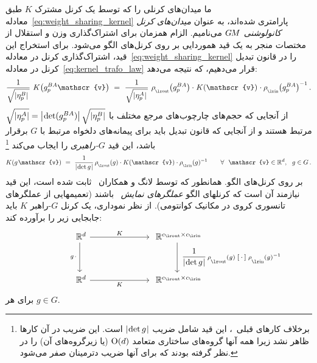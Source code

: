 ما میدان‌های کرنلی را که توسط یک کرنل مشترک $K$ طبق معادله~\eqref{eq:weight_sharing_kernel} پارامتری شده‌اند، به عنوان \emph{میدان‌های کرنل کانولوشنی} $G\mkern-1.4muM$ می‌نامیم.
الزام همزمان برای اشتراک‌گذاری وزن و استقلال از مختصات منجر به یک قید هموردایی بر روی کرنل‌های الگو می‌شود.
برای استخراج این قید، اشتراک‌گذاری کرنل در معادله~\eqref{eq:weight_sharing_kernel} را در قانون تبدیل کرنل در معادله~\eqref{eq:kernel_trafo_law} قرار می‌دهیم، که نتیجه می‌دهد:
\begin{align}
	\frac{1}{\sqrt{|\eta_p^B|\,}}\ K\big(g_p^{BA} \mathscr{v}\big)
	\ =\ 
	\frac{1}{\sqrt{|\eta_p^A|\,}}\ 
	\rhoout\big(g_p^{BA}\big) \cdot\mkern1mu 
	K(\mathscr{v})
	\mkern1mu\cdot \rhoin\big(g_p^{BA}\big)^{-1} \,.
\end{align}
از آنجایی که حجم‌های چارچوب‌های مرجع مختلف با
$\sqrt{|\eta_p^A|} = \big|\mkern-2mu \det(g_p^{BA})\big|\, \sqrt{|\eta_p^B|}$
مرتبط هستند و از آنجایی که قانون تبدیل باید برای پیمانه‌های دلخواه مرتبط با $G$ برقرار باشد، این قید \emph{$G$-راهبری} را ایجاب می‌کند%
\footnote{
	برخلاف کارهای قبلی~\cite{3d_steerableCNNs,Weiler2019_E2CNN,gaugeIco2019,kicanaoglu2019gaugeSphere,deHaan2020meshCNNs}، این قید شامل ضریب $|\mkern-2mu \det g \mkern1mu|$ است.
	این ضریب در آن کارها ظاهر نشد زیرا همه آنها گروه‌های ساختاری متعامد $\operatorname{O}(d)$ (یا زیرگروه‌های آن) را در نظر گرفته بودند که برای آنها ضریب دترمینان صفر می‌شود.
}
\begin{align}\label{eq:kernel_constraint}
	K(g\mkern1.5mu \mathscr{v})\ = \ \frac{1}{\detg}\, \rhoout(g) \cdot K(\mathscr{v}) \cdot \rhoin(g)^{-1}
	\qquad \forall\ \ \mathscr{v} \in \R^d,\ \ g\in G \,.
\end{align}
بر روی کرنل‌های الگو.
همانطور که توسط لانگ و همکاران~\cite{lang2020WignerEckart} ثابت شده است، این قید نیازمند آن است که کرنلهای الگو \emph{عملگرهای نمایش}~\cite{jeevanjee2011reprOp} باشند (تعمیمهایی از عملگرهای تانسوری کروی در مکانیک کوانتومی).
از نظر نموداری، یک کرنل $G$-راهبر $K$ باید جابجایی زیر را برآورده کند:
\begin{equation}\label{cd:kernel_steerability}
	\qquad\qquad
	\begin{tikzcd}[column sep=70pt, row sep=35pt, font=\normalsize]
		\R^d
		\arrow[d, "g\mkern2mu \cdot\,"']
		\arrow[r, "K"]
		&
		\R^{\cout\times\cin}
		\arrow[d, "\ \scalebox{.96}{$\displaystyle \frac{1}{\detg}$}\, \rhoout(g) \; \scalebox{1.1}{$[\,\cdot\,]$} \; \rhoin(g)^{-1}"]
		\\
		\R^d
		\arrow[r, "K"']
		&
		\R^{\cout\times\cin}
	\end{tikzcd}
\end{equation}
برای هر $g\in G$.
